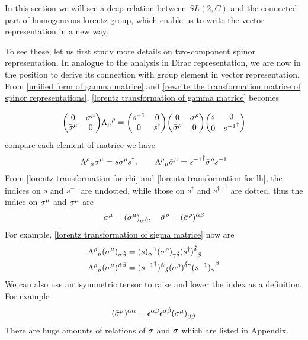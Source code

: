 In this section we will see a deep relation between $SL(2,C)$ and the connected part of homogeneous lorentz group, which enable us to write the vector representation in a new way.

To see these, let us first study more details on two-component spinor representation. In analogue to the analysis in Dirac representation, we are now in the position to derive its connection with group element in vector representation. From \eqref{unified form of gamma matrice} and \eqref{rewrite the transformation matrice of spinor representations}, \eqref{lorentz transformation of gamma matrice} becomes

\begin{equation} 
\mqty( 0 & \s^{\m} \\ \bar{\s}^{\m} & 0)
{\Lambda_{\m}}^{\rh}
= \mqty(s^{-1} & 0 \\ 0 & s^{\dagger} )
\mqty( 0 & \s^{\rh} \\ \bar{\s}^{\rh} & 0)
 \mqty(s & 0 \\ 0 & {s^{-1}}^{\dagger} )
\end{equation}
compare each element of matrice we have
\begin{equation}\label{lorentz transformation of sigma matrice}
{\Lambda^{\rho}}_{\mu} \sigma^{\mu} =  s\sigma^{\rho} {s}^{\dagger}
,\qquad
{\Lambda^{\rho}}_{\mu} \bar{\sigma}^{\mu} =  {s^{-1}}^{\dagger}\bar{\sigma}^{\rho} s^{-1}
\end{equation}
From \eqref{lorentz transformation for chi} and \eqref{lorenta transformation for lh}, the indices on $s$ and $s^{-1}$ are undotted, while those on $s^{\dagger}$ and ${s^{\dagger}}^{-1}$ are dotted, thus the indice on $\sigma^{\mu}$ and $\sigma^{\mu}$ are 
\begin{equation}
\sigma^{\mu} = (\sigma^{\mu})_{\alpha\dot{\beta}},\quad
\bar{\sigma}^{\rho} = (\bar{\sigma}^{\rho})^{\dot{\alpha}\beta}
\end{equation} 
For example, \eqref{lorentz transformation of sigma matrice} now are
\begin{align}
{\Lambda^{\rho}}_{\mu} (\sigma^{\mu})_{\alpha\dot{\beta}} &=  
({s)_{\alpha}}^{\gamma}
(\sigma^{\rho})_{\gamma\dot{\delta}} 
{({s}^{\dagger})^{\dot{\delta}}}_{\dot{\beta}}\\
{\Lambda^{\rho}}_{\mu} (\bar{\sigma}^{\mu})^{\dot{\alpha}\beta}
&=
{({s^{-1}}^{\dagger})^{\dot{\alpha}}}_{\dot{\delta}}
(\bar{\sigma}^{\rho})^{\dot{\delta}\gamma} 
{(s^{-1})_{\gamma}}^{\beta}
\end{align}
We can also use antisymmetric tensor to raise and lower the index as a definition. For example
\begin{equation}
(\bar{\sigma}^{\mu})^{\dot{\alpha}\alpha} = \epsilon^{\alpha\beta}\epsilon^{\dot{\alpha}\dot{\beta}}(\sigma^{\mu})_{\beta\dot{\beta}}
\end{equation}  
There are huge amounts of relations of $\sigma$ and $\bar{\sigma}$ which are listed in Appendix. 

